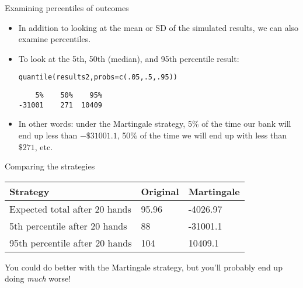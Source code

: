\documentclass{beamer}\usepackage[]{graphicx}\usepackage[]{color}
\makeatletter
\newcommand{\hlnum}[1]{\textcolor[rgb]{0.824,0.412,0.118}{#1}}%
\newcommand{\hlstd}[1]{\textcolor[rgb]{1,0.894,0.769}{#1}}%
\newcommand{\hlkwc}[1]{\textcolor[rgb]{0.78,0.941,0.545}{#1}}%
\newcommand{\hlkwd}[1]{\textcolor[rgb]{1,0.78,0.769}{#1}}%
\newenvironment{kframe}{%
 \def\at@end@of@kframe{}%
 \ifinner\ifhmode%
  \def\at@end@of@kframe{\end{minipage}}%
  \begin{minipage}{\columnwidth}%
 \fi\fi%
 \def\FrameCommand##1{\hskip\@totalleftmargin \hskip-\fboxsep
 \colorbox{shadecolor}{##1}\hskip-\fboxsep
     \hskip-\linewidth \hskip-\@totalleftmargin \hskip\columnwidth}%
 \MakeFramed {\advance\hsize-\width
   \@totalleftmargin\z@ \linewidth\hsize
   \@setminipage}}%
 {\par\unskip\endMakeFramed%
 \at@end@of@kframe}
\newenvironment{knitrout}{}{} %
\makeatother
\begin{document}
\begin{darkframes}
\begin{frame}[fragile]
\begin{knitrout}
\end{knitrout}
    \end{frame}

    \begin{frame}[fragile]{Examining percentiles of outcomes}
      \begin{itemize}[<+->]
        \item In addition to looking at the mean or SD of the simulated results, we can also examine percentiles.
        \item To look at the 5th, 50th (median), and 95th percentile result:
\begin{knitrout}
\begin{kframe}
\begin{alltt}
\hlkwd{quantile}\hlstd{(results2,} \hlkwc{probs}\hlstd{=}\hlkwd{c}\hlstd{(}\hlnum{.05}\hlstd{,} \hlnum{.5}\hlstd{,} \hlnum{.95}\hlstd{))}
\end{alltt}
\begin{verbatim}
    5%    50%    95% 
-31001    271  10409 
\end{verbatim}
\end{kframe}
\end{knitrout}
        \item In other words: under the Martingale strategy, 5\% of the time our bank will end up less than $-\$31001.1$, 50\% of the time we will end up with less than $\$271$, etc.
      \end{itemize}
    \end{frame}

    \begin{frame}{Comparing the strategies}
      \begin{center}
        \begin{tabular}{l|ll}
          Strategy & Original & Martingale \\
          \hline
          Expected total after 20 hands & 95.96 & -4026.97 \\
          5th percentile after 20 hands & 88 & -31001.1 \\
          95th percentile after 20 hands & 104 & 10409.1 \\
        \end{tabular}

        \pause\bigskip
        You could do better with the Martingale strategy, but you'll probably end up doing \emph{much} worse!
      \end{center}

    \end{frame}


\end{darkframes}
\end{document}

